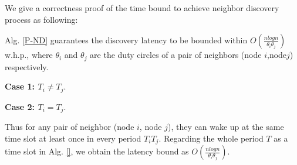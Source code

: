 We give a correctness proof of the time 
bound to achieve neighbor discovery process as following:


\begin{theorem}
\label{PBND1}
Alg. \ref{P-ND} guarantees the discovery latency
to be bounded within $O(\frac{nlogn}{\theta_i\theta_j})$ w.h.p.,
where $\theta_i$ and $\theta_j$ are the duty circles of 
a pair of neighbors (node $i$,node$j$) respectively.
\end{theorem}



\begin{IEEEproof}
\textbf{Case 1: $T_i \neq T_j$}.

\textbf{Case 2: $T_i = T_j$}.

Thus for any pair of neighbor (node $i$, node $j$), they can wake up
at the same time slot at least once in every period $T_iT_j$. Regarding 
the whole period $T$ as a time slot in Alg. \ref{}, we obtain the latency 
bound as $O(\frac{nlogn}{\theta_i\theta_j})$.





\end{IEEEproof}




